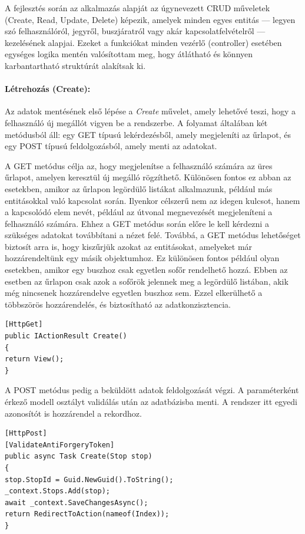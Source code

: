 A fejlesztés során az alkalmazás alapját az úgynevezett CRUD műveletek (Create, Read, Update, Delete) képezik, amelyek minden egyes entitás — legyen szó felhasználóról, jegyről, buszjáratról vagy akár kapcsolatfelvételről — kezelésének alapjai. Ezeket a funkciókat minden vezérlő (controller) esetében egységes logika mentén valósítottam meg, hogy átlátható és könnyen karbantartható struktúrát alakítsak ki.

\paragraph{Létrehozás (Create):}
Az adatok mentésének első lépése a \textit{Create} művelet, amely lehetővé teszi, hogy a felhasználó új megállót vigyen be a rendszerbe. A folyamat általában két metódusból áll: egy GET típusú lekérdezésből, amely megjeleníti az űrlapot, és egy POST típusú feldolgozásból, amely menti az adatokat.

A GET metódus célja az, hogy megjelenítse a felhasználó számára az üres űrlapot, amelyen keresztül új megálló rögzíthető. Különösen fontos ez abban az esetekben, amikor az űrlapon legördülő listákat alkalmazunk, például más entitásokkal való kapcsolat során. Ilyenkor célszerű nem az idegen kulcsot, hanem a kapcsolódó elem nevét, például az útvonal megnevezését megjeleníteni a felhasználó számára. Ehhez a GET metódus során előre le kell kérdezni a szükséges adatokat továbbítani a nézet felé. Továbbá, a GET metódus lehetőséget biztosít arra is, hogy kiszűrjük azokat az entitásokat, amelyeket már hozzárendeltünk egy másik objektumhoz. Ez különösen fontos például olyan esetekben, amikor egy buszhoz csak egyetlen sofőr rendelhető hozzá. Ebben az esetben az űrlapon csak azok a sofőrök jelennek meg a legördülő listában, akik még nincsenek hozzárendelve egyetlen buszhoz sem. Ezzel elkerülhető a többszörös hozzárendelés, és biztosítható az adatkonzisztencia.

\begin{lstlisting}
[HttpGet]
public IActionResult Create()
{
return View();
}
\end{lstlisting}

A POST metódus pedig a beküldött adatok feldolgozását végzi. A paraméterként érkező modell osztályt validálás után az adatbázisba menti. A rendszer itt egyedi azonosítót is hozzárendel a rekordhoz.

\begin{lstlisting}
[HttpPost]
[ValidateAntiForgeryToken]
public async Task Create(Stop stop)
{
stop.StopId = Guid.NewGuid().ToString();
_context.Stops.Add(stop);
await _context.SaveChangesAsync();
return RedirectToAction(nameof(Index));
}
\end{lstlisting}

